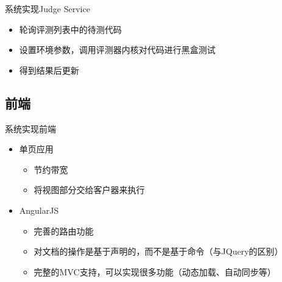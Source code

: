 \documentclass{beamer}
\begin{document}
\begin{frame}{系统实现}{Judge Service}
\begin{itemize}
	\item 轮询评测列表中的待测代码
	\item 设置环境参数，调用评测器内核对代码进行黑盒测试
	\item 得到结果后更新
\end{itemize}
\end{frame}

\subsection{前端}
\begin{frame}{系统实现}{前端}
\begin{itemize}
	\item 单页应用
	\begin{itemize}
		\item 节约带宽
		\item 将视图部分交给客户器来执行
	\end{itemize}
	\item AngularJS
	\begin{itemize}
		\item 完善的路由功能
		\item 对文档的操作是基于声明的，而不是基于命令（与JQuery的区别）
		\item 完整的MVC支持，可以实现很多功能（动态加载、自动同步等）
	\end{itemize}
\end{itemize}
\end{frame}

\end{document}
